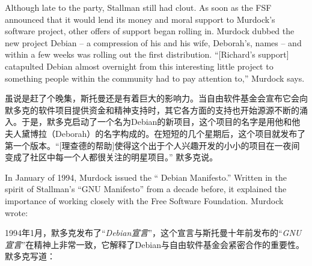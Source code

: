 
\ifdefined\eng
Although late to the party, Stallman still had clout. As soon as the FSF announced that it would lend its money and moral support to Murdock's software project, other offers of support began rolling in. Murdock dubbed the new project Debian -- a compression of his and his wife, Deborah's, names -- and within a few weeks was rolling out the first distribution. ``[Richard's support] catapulted Debian almost overnight from this interesting little project to something people within the community had to pay attention to,'' Murdock says.
\fi

\ifdefined\chs
虽说是赶了个晚集，斯托曼还是有着巨大的影响力。当自由软件基金会宣布它会向默多克的软件项目提供资金和精神支持时，其它各方面的支持也开始源源不断的涌入。于是，默多克启动了一个名为Debian的新项目，这个项目的名字是用他和他夫人黛博拉（Deborah）的名字构成的。在短短的几个星期后，这个项目就发布了第一个版本。``[理查德的帮助]使得这个出于个人兴趣开发的小小的项目在一夜间变成了社区中每一个人都很关注的明星项目。'' 默多克说。
\fi

\ifdefined\eng
In January of 1994, Murdock issued the `` Debian Manifesto.'' Written in the spirit of Stallman's ``GNU Manifesto'' from a decade before, it explained the importance of working closely with the Free Software Foundation. Murdock wrote:
\fi

\ifdefined\chs
1994年1月，默多克发布了``\textit{Debian宣言}''，这个宣言与斯托曼十年前发布的``\textit{GNU宣言}''在精神上非常一致，它解释了Debian与自由软件基金会紧密合作的重要性。默多克写道：
\fi

